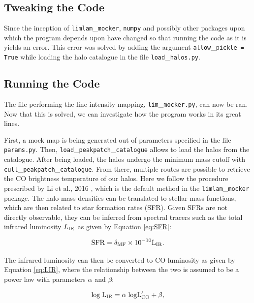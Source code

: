 \documentclass[apj]{emulateapj}
\begin{document}
\subsection{Tweaking the Code}
Since the inception of \texttt{limlam}\_\texttt{mocker}, \texttt{numpy} and possibly other packages upon which the program depends upon have changed so that running the code as it is yields an error. This error was solved by adding the argument \texttt{allow}\_\texttt{pickle = True} while loading the halo catalogue in the file \texttt{load}\_\texttt{halos.py}. 

\pagebreak

\subsection{Running the Code}
The file performing the line intensity mapping, \texttt{lim}\_\texttt{mocker.py}, can now be ran. Now that this is solved, we can investigate how the program works in its great lines.

First, a mock map is being generated out of parameters specified in the file \texttt{params.py}. Then, \texttt{load}\_\texttt{peakpatch}\_\texttt{catalogue} allows to load the halos from the catalogue. After being loaded, the halos undergo the minimum mass cutoff with \texttt{cull}\_\texttt{peakpatch}\_\texttt{catalogue}. From there, multiple routes are possible to retrieve the CO brightness temperature of our halos. Here we follow the procedure prescribed by Li et al., 2016 \cite{Li_2016}, which is the default method in the \texttt{limlam}\_\texttt{mocker} package. The halo mass densities can be translated to stellar mass functions, which are then related to star formation rates (SFR). Given SFRs are not directly observable, they can be inferred from spectral tracers such as the total infrared luminosity $L_{\rm{IR}}$ as given by Equation \ref{eq:SFR}:


\begin{equation}
    \rm{SFR} = \delta_{\rm{MF}} \times 10^{-10}  L_{\rm{IR}}.
    \label{eq:SFR}
\end{equation}

The infrared luminosity can then be converted to CO luminosity as given by Equation \ref{eq:LIR}, where the relationship between the two is assumed to be a power law with parameters $\alpha$ and $\beta$:

\begin{equation}
    \rm{log} \hspace{1mm} L_{\rm{IR}} = \alpha \hspace{1mm} \rm{log} L_{CO}' + \beta,
    \label{eq:LIR}
\end{equation}
\end{document}
